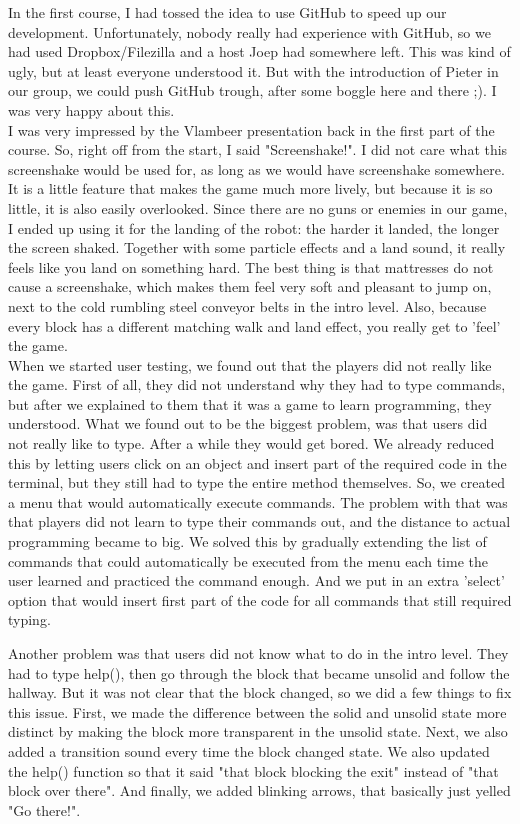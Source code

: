 \documentclass[a4paper,twoside,12pt]{article}
\begin{document}
In the first course, I had tossed the idea to use GitHub to speed up our development. Unfortunately, nobody really had experience with GitHub, so we had used Dropbox/Filezilla and a host Joep had somewhere left. This was kind of ugly, but at least everyone understood it. But with the introduction of Pieter in our group, we could push GitHub trough, after some boggle here and there ;). I was very happy about this.\\

I was very impressed by the Vlambeer presentation back in the first part of the course. So, right off from the start, I said "Screenshake!". I did not care what this screenshake would be used for, as long as we would have screenshake somewhere. It is a little feature that makes the game much more lively, but because it is so little, it is also easily overlooked. Since there are no guns or enemies in our game, I ended up using it for the landing of the robot: the harder it landed, the longer the screen shaked. Together with some particle effects and a land sound, it really feels like you land on something hard. The best thing is that mattresses do not cause a screenshake, which makes them feel very soft and pleasant to jump on, next to the cold rumbling steel conveyor belts in the intro level. Also, because every block has a different matching walk and land effect, you really get to 'feel' the game.\\

When we started user testing, we found out that the players did not really like the game. First of all, they did not understand why they had to type commands, but after we explained to them that it was a game to learn programming, they understood. What we found out to be the biggest problem, was that users did not really like to type. After a while they would get bored. We already reduced this by letting users click on an object and insert part of the required code in the terminal, but they still had to type the entire method themselves. So, we created a menu that would automatically execute commands. The problem with that was that players did not learn to type their commands out, and the distance to actual programming became to big. We solved this by gradually extending the list of commands that could automatically be executed from the menu each time the user learned and practiced the command enough. And we put in an extra 'select' option that would insert first part of the code for all commands that still required typing. 

Another problem was that users did not know what to do in the intro level. They had to type help(), then go through the block that became unsolid and follow the hallway. But it was not clear that the block changed, so we did a few things to fix this issue. First, we made the difference between the solid and unsolid state more distinct by making the block more transparent in the unsolid state. Next, we also added a transition sound every time the block changed state. We also updated the help() function so that it said "that block blocking the exit" instead of "that block over there". And finally, we added blinking arrows, that basically just yelled "Go there!".\\
\end{document}
